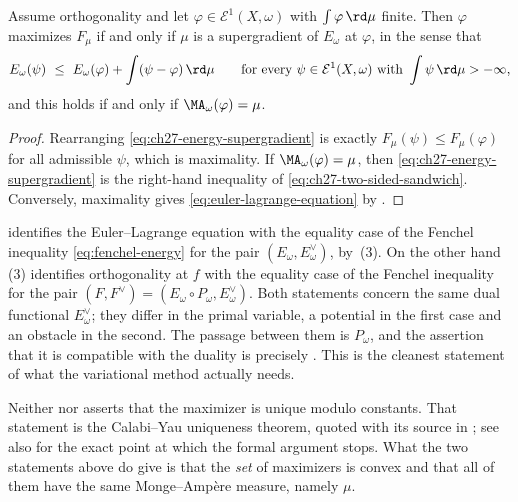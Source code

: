 \begin{corollary}
\label{cor:ch27-euler-lagrange-supergradient}
Assume orthogonality and let $\varphi\in\mathcal E^1(X,\omega)$ with
$\int\varphi\,\rd\mu$ finite.  Then $\varphi$ maximizes $F_\mu$ if and
only if $\mu$ is a supergradient of $E_\omega$ at $\varphi$, in the
sense that
\begin{equation}\label{eq:ch27-energy-supergradient}
 E_\omega(\psi)\ \leq\ E_\omega(\varphi)+\int(\psi-\varphi)\,\rd\mu
 \qquad\text{for every }\psi\in\mathcal E^1(X,\omega)
 \text{ with }\int\psi\,\rd\mu>-\infty,
\end{equation}
and this holds if and only if $\MA_\omega(\varphi)=\mu$.
\end{corollary}

\begin{proof}
Rearranging \eqref{eq:ch27-energy-supergradient} is exactly
$F_\mu(\psi)\leq F_\mu(\varphi)$ for all admissible $\psi$, which is
maximality.  If $\MA_\omega(\varphi)=\mu$, then
\eqref{eq:ch27-energy-supergradient} is the right-hand inequality of
\eqref{eq:ch27-two-sided-sandwich}.  Conversely, maximality gives
\eqref{eq:euler-lagrange-equation} by
.
\end{proof}

\begin{remark}
\label{rem:ch27-two-legendre}
 identifies the Euler--Lagrange
equation with the equality case of the Fenchel inequality
\eqref{eq:fenchel-energy} for the pair $(E_\omega,E^\vee_\omega)$, by
\,(3).  On the other hand
\,(3) identifies orthogonality at
$f$ with the equality case of the Fenchel inequality for the pair
$(F,F^\vee)=(E_\omega\circ P_\omega,E^\vee_\omega)$.  Both statements
concern the same dual functional $E^\vee_\omega$; they differ in the
primal variable, a potential in the first case and an obstacle in the
second.  The passage between them is $P_\omega$, and the assertion that
it is compatible with the duality is precisely
.  This is the cleanest
statement of what the variational method actually needs.
\end{remark}

\begin{remark}
\label{rem:ch27-uniqueness-pointer}
Neither  nor
 asserts that the maximizer is
unique modulo constants.  That statement is the Calabi--Yau uniqueness
theorem, quoted with its source in
; see also
 for the exact point at which the formal
argument stops.  What the two statements above do give is that the
\emph{set} of maximizers is convex and that all of them have the same
Monge--Amp\`ere measure, namely $\mu$.
\end{remark}

